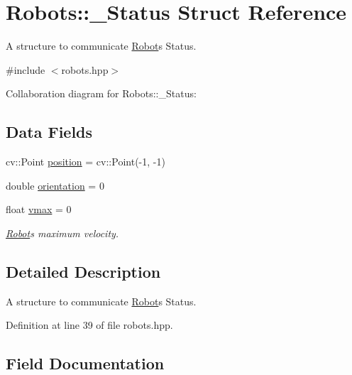 \hypertarget{struct_robots_1_1___status}{}\section{Robots\+:\+:\+\_\+\+Status Struct Reference}
\label{struct_robots_1_1___status}


A structure to communicate \hyperlink{struct_robots_1_1_robot}{Robot}\textquotesingle{}s Status.  




{\ttfamily \#include $<$robots.\+hpp$>$}



Collaboration diagram for Robots\+:\+:\+\_\+\+Status\+:
\subsection*{Data Fields}
\begin{DoxyCompactItemize}
\item 
cv\+::\+Point \hyperlink{struct_robots_1_1___status_a9ae95d6ec38055984ee4eaac82138373}{position} = cv\+::\+Point(-\/1, -\/1)
\item 
double \hyperlink{struct_robots_1_1___status_ae7a5a28b09e25cf94607fc00b57f7c7e}{orientation} = 0
\item 
float \hyperlink{struct_robots_1_1___status_a2d97c7aa10c75f32c10d25d0683450a3}{vmax} = 0
\begin{DoxyCompactList}\small\item\em \hyperlink{struct_robots_1_1_robot}{Robot}\textquotesingle{}s maximum velocity. \end{DoxyCompactList}\end{DoxyCompactItemize}


\subsection{Detailed Description}
A structure to communicate \hyperlink{struct_robots_1_1_robot}{Robot}\textquotesingle{}s Status. 

Definition at line 39 of file robots.\+hpp.



\subsection{Field Documentation}
\mbox{\label{struct_robots_1_1___status_ae7a5a28b09e25cf94607fc00b57f7c7e}} 
